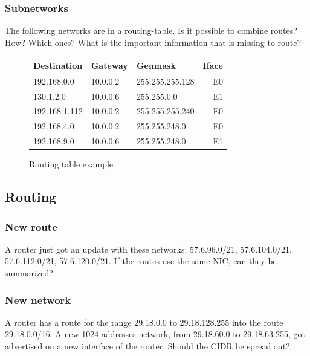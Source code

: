 \documentclass[11pt]{article}
\begin{document}
\subsubsection{Subnetworks}
The following networks are in a routing-table. Is it possible to combine routes? How? Which ones? What is the important information that is missing to route? %
\begin{figure}[h]
  \centering
  \resizebox{10cm}{!} {
    \begin{tabular}{lllr}
      \textbf{Destination} & \textbf{Gateway} & \textbf{Genmask} & \textbf{Iface} \\ \hline
      192.168.0.0   & 10.0.0.2 & 255.255.255.128 & E0 \\
      130.1.2.0     & 10.0.0.6 & 255.255.0.0     & E1 \\
      192.168.1.112 & 10.0.0.2 & 255.255.255.240 & E0 \\
      192.168.4.0   & 10.0.0.2 & 255.255.248.0   & E0 \\
      192.168.9.0   & 10.0.0.6 & 255.255.248.0   & E1 \\
    \end{tabular}
  }
  \caption{Routing table example}
  \label{fig:rting-tbl}
\end{figure}
\subsection{Routing}
\subsubsection{New route}
A router just got an update with these networks: 57.6.96.0/21, 57.6.104.0/21, 57.6.112.0/21, 57.6.120.0/21. If the routes use the same NIC, can they be summarized? %
\subsubsection{New network}
A router has a route for the range 29.18.0.0 to 29.18.128.255 into the route 29.18.0.0/16. A new 1024-addresses network, from 29.18.60.0 to 29.18.63.255, got advertised on a new interface of the router. Should the CIDR be spread out? %
\end{document}
